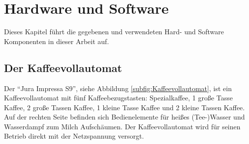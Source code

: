 \chapter{Hardware und Software}
Dieses Kapitel führt die gegebenen und verwendeten Hard- und Software Komponenten in dieser Arbeit auf.

\section{Der Kaffeevollautomat}
Der "`Jura Impressa S9"', siehe Abbildung \ref{subfig:Kaffeevollautomat}, ist ein Kaffeevollautomat mit fünf Kaffeebezugstasten: Spezialkaffee, 1 große Tasse Kaffee, 2 große Tassen Kaffee, 1 kleine Tasse Kaffee und 2 kleine Tassen Kaffee.
Auf der rechten Seite befinden sich Bedienelemente für heißes (Tee-)Wasser und Wasserdampf zum Milch Aufschäumen.
Der Kaffeevollautomat wird für seinen Betrieb direkt mit der Netzspannung versorgt.



